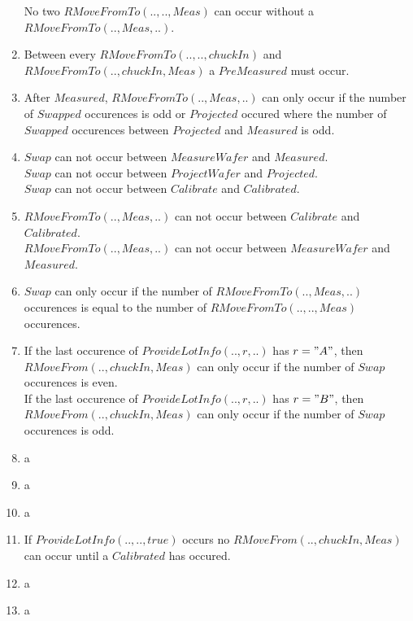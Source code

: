 \begin{enumerate}
	No two $RMoveFromTo(..,..,Meas)$ can occur without a $RMoveFromTo(..,Meas,..)$.
	\item Between every $RMoveFromTo(..,..,chuckIn)$ and $RMoveFromTo(..,chuckIn,Meas)$ a $PreMeasured$ must occur.
	\item After $Measured$, $RMoveFromTo(..,Meas,..)$ can only occur if the number of $Swapped$ occurences is odd or $Projected$ occured where the number of $Swapped$ occurences between $Projected$ and $Measured$ is odd.
	\item $Swap$ can not occur between $MeasureWafer$ and $Measured$.\\$Swap$ can not occur between $ProjectWafer$ and $Projected$. \\$Swap$ can not occur between $Calibrate$ and $Calibrated$.
	\item $RMoveFromTo(.., Meas, ..)$ can not occur between $Calibrate$ and $Calibrated$.\\ $RMoveFromTo(.., Meas, ..)$ can not occur between $MeasureWafer$ and $Measured$.\\
	\item $Swap$ can only occur if the number of $RMoveFromTo(.., Meas,..)$ occurences is equal to the number of $RMoveFromTo(..,..,Meas)$ occurences.
	\item If the last occurence of $ProvideLotInfo(..,r,..)$ has $r="A"$, then $RMoveFrom(..,chuckIn,Meas)$ can only occur if the number of $Swap$ occurences is even.\\
	If the last occurence of $ProvideLotInfo(..,r,..)$ has $r="B"$, then $RMoveFrom(..,chuckIn,Meas)$ can only occur if the number of $Swap$ occurences is odd.\\
	\item a
	\item a
	\item a
	\item If $ProvideLotInfo(..,..,true)$ occurs no $RMoveFrom(..,chuckIn,Meas)$ can occur until a $Calibrated$ has occured.
	\item a
	\item a
\end{enumerate}